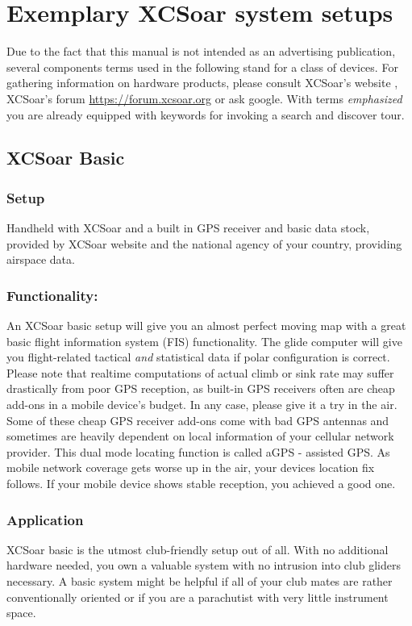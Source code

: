 \section{Exemplary XCSoar system setups}
Due to the fact that this manual is not intended as an advertising publication,
several components terms used in the following stand for a class of devices. For
gathering information on hardware products, please consult XCSoar's website 
, XCSoar's forum \url{https://forum.xcsoar.org} or ask google. With terms \emph{emphasized} you are already 
equipped with keywords for invoking a search and discover tour.

\subsection*{XCSoar Basic}
\subsubsection*{Setup} Handheld with XCSoar and a built in GPS receiver and basic 
data stock, provided by XCSoar website and the national agency of your country, 
providing airspace data.

\subsubsection*{Functionality:} An XCSoar basic setup will give you an almost 
perfect moving map with a great basic flight information system (FIS) 
functionality. The glide computer will give you flight-related tactical 
\emph{and} statistical data if polar configuration is correct. Please note that
realtime computations of actual climb or sink rate may suffer drastically from
poor GPS reception, as built-in GPS receivers often are cheap add-ons in a mobile
device's budget. In any case, please give it a try in the air.  Some of these 
cheap GPS receiver add-ons come with bad GPS antennas and sometimes are heavily 
dependent on local information of your cellular network provider. This dual mode 
locating function is called aGPS - assisted GPS. As mobile network coverage gets 
worse up in the air, your devices location fix follows. If your mobile device 
shows stable reception, you achieved a good one.

\subsubsection*{Application} XCSoar basic is the utmost club-friendly setup out 
of all.  With no additional hardware needed, you own a valuable system with no 
intrusion into club gliders necessary. A basic system might be helpful if all of 
your club mates are rather conventionally oriented or if you are a parachutist 
with very little instrument space.

